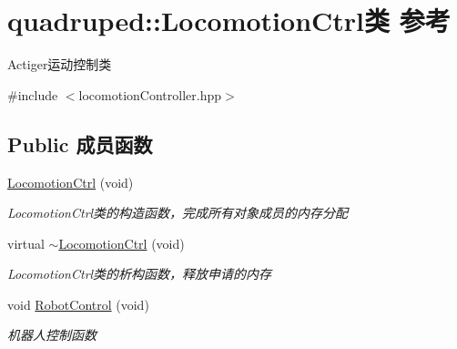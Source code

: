 \hypertarget{classquadruped_1_1LocomotionCtrl}{}\section{quadruped\+:\+:Locomotion\+Ctrl类 参考}
\label{classquadruped_1_1LocomotionCtrl}


Actiger运动控制类  




{\ttfamily \#include $<$locomotion\+Controller.\+hpp$>$}

\subsection*{Public 成员函数}
\begin{DoxyCompactItemize}
\item 
\mbox{\label{classquadruped_1_1LocomotionCtrl_a233d4539571e8970451e1bf800a5eeb8}} 
\hyperlink{classquadruped_1_1LocomotionCtrl_a233d4539571e8970451e1bf800a5eeb8}{Locomotion\+Ctrl} (void)
\begin{DoxyCompactList}\small\item\em Locomotion\+Ctrl类的构造函数，完成所有对象成员的内存分配 \end{DoxyCompactList}\item 
\mbox{\label{classquadruped_1_1LocomotionCtrl_a94ec7af0dc2d159e91bdc541c00e34fd}} 
virtual \hyperlink{classquadruped_1_1LocomotionCtrl_a94ec7af0dc2d159e91bdc541c00e34fd}{$\sim$\+Locomotion\+Ctrl} (void)
\begin{DoxyCompactList}\small\item\em Locomotion\+Ctrl类的析构函数，释放申请的内存 \end{DoxyCompactList}\item 
\mbox{\label{classquadruped_1_1LocomotionCtrl_ae1ea49db9859d92fb33a4959dadfeeee}} 
void \hyperlink{classquadruped_1_1LocomotionCtrl_ae1ea49db9859d92fb33a4959dadfeeee}{Robot\+Control} (void)
\begin{DoxyCompactList}\small\item\em 机器人控制函数 \end{DoxyCompactList}\end{DoxyCompactItemize}
